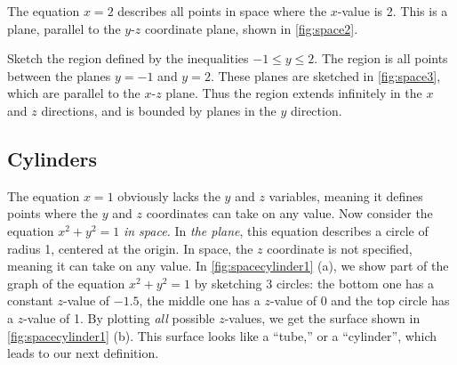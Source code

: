 
\begin{example}\label{ex_space_x_is_two}%
The equation $x=2$ describes all points in space where the $x$-value is 2. This is a plane, parallel to the $y$-$z$ coordinate plane, shown in \autoref{fig:space2}.
\end{example}

\begin{example}\label{ex_space3}%
Sketch the region defined by the inequalities $-1\leq y\leq 2$.
\solution
%
%
The region is all points between the planes $y=-1$ and $y=2$. These planes are sketched in \autoref{fig:space3}, which are parallel to the $x$-$z$ plane. Thus the region extends infinitely in the $x$ and $z$ directions, and is bounded by planes in the $y$ direction.
\end{example}

\subsection{Cylinders}

The equation $x=1$ obviously lacks the $y$ and $z$ variables, meaning it defines points where the $y$ and $z$ coordinates can take on any value. Now consider the equation $x^2+y^2=1$ \emph{in space.} In \emph{the plane}, this equation describes a circle of radius 1, centered at the origin. In space, the $z$ coordinate is not specified, meaning it can take on any value. In \autoref{fig:spacecylinder1} (a), we show part of the graph of the equation $x^2+y^2=1$ by sketching 3 circles: the bottom one has a constant $z$-value of $-1.5$, the middle one has a $z$-value of 0 and the top circle has a $z$-value of 1. By plotting \emph{all} possible $z$-values, we get the  surface shown in \autoref{fig:spacecylinder1} (b). This surface looks like a ``tube,'' or a ``cylinder'', which leads to our next definition.

